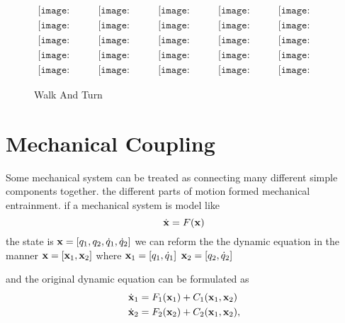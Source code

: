 {\begin{figure}[!htbp]
  \begin{center}
  $
     \begin{array}{ccccc}
\texttt{[image: turn/0001.eps]}&
\texttt{[image: turn/0201.eps]}&
\texttt{[image: turn/0301.eps]}&
\texttt{[image: turn/0401.eps]}&
\texttt{[image: turn/0501.eps]}
\\
\texttt{[image: turn/0601.eps]}&
\texttt{[image: turn/0701.eps]}&
\texttt{[image: turn/0801.eps]}&
\texttt{[image: turn/0901.eps]}&
\texttt{[image: turn/1001.eps]}
\\
\texttt{[image: turn/1101.eps]}&
\texttt{[image: turn/1201.eps]}&
\texttt{[image: turn/1301.eps]}&
\texttt{[image: turn/1401.eps]}&
\texttt{[image: turn/1501.eps]}
\\
\texttt{[image: turn/1601.eps]}&
\texttt{[image: turn/1701.eps]}&
\texttt{[image: turn/1801.eps]}&
\texttt{[image: turn/1901.eps]}&
\texttt{[image: turn/2001.eps]}
\\
\texttt{[image: turn/2101.eps]}&
\texttt{[image: turn/2201.eps]}&
\texttt{[image: turn/2301.eps]}&
\texttt{[image: turn/2401.eps]}&
\texttt{[image: turn/2501.eps]}

\end{array}$
    \caption{Walk And Turn}
    \label{fig:walkturn}
\end{center}
\end{figure}





\section{Mechanical Coupling}
Some mechanical system can be treated as connecting many different simple components together.
the different parts of motion formed mechanical entrainment.
if a mechanical system is model like
\[
\dot{\mathbf{x}}=F(\mathbf{x})
\]
the state is $\mathbf{x}=[q_1,q_2,\dot{q}_1,\dot{q}_2]$
we can reform the the dynamic equation in the manner
$\mathbf{x}=[\mathbf{x}_1,\mathbf{x}_2]$
where
$\mathbf{x}_1=[q_1,\dot{q}_1]$
$\mathbf{x}_2=[q_2,\dot{q}_2]$

and  the original dynamic equation can be formulated as
\begin{align}
\dot{\mathbf{x}}_1&=F_1(\mathbf{x}_1)+C_1(\mathbf{x}_1,\mathbf{x}_2)\nonumber\\
\dot{\mathbf{x}}_2&=F_2(\mathbf{x}_2)+C_2(\mathbf{x}_1,\mathbf{x}_2),\nonumber
\end{align}

}
